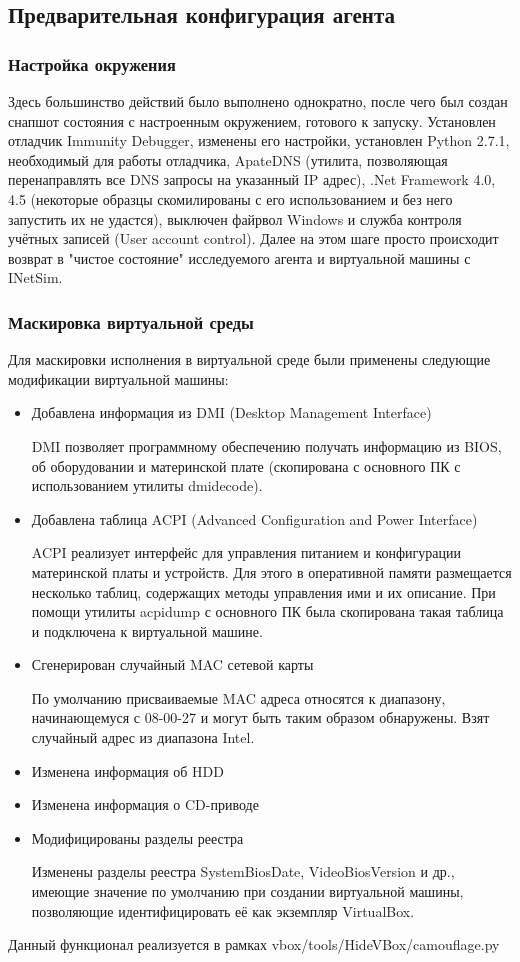 \subsection {Предварительная конфигурация агента}
\subsubsection {Настройка окружения}
Здесь большинство действий было выполнено однократно, после чего был создан снапшот состояния с настроенным окружением, готового к запуску. Установлен отладчик Immunity Debugger, изменены его настройки, установлен Python 2.7.1, необходимый для работы отладчика, ApateDNS (утилита, позволяющая перенаправлять все DNS запросы на указанный IP адрес), .Net Framework 4.0, 4.5 (некоторые образцы скомилированы с его использованием и без него запустить их не удастся), выключен файрвол Windows и служба контроля учётных записей (User account control).
Далее на этом шаге просто происходит возврат в "чистое состояние" исследуемого агента и виртуальной машины с INetSim.
\subsubsection {Маскировка виртуальной среды}
Для маскировки исполнения в виртуальной среде были применены следующие модификации виртуальной машины:
\begin {itemize}
	\item Добавлена информация из DMI (Desktop Management Interface)

	DMI позволяет программному обеспечению получать информацию из BIOS, об оборудовании и материнской плате (скопирована с основного ПК с использованием утилиты dmidecode).
	\item Добавлена таблица ACPI (Advanced Configuration and Power Interface)

	ACPI реализует интерфейс для управления питанием и конфигурации материнской платы и устройств. Для этого в оперативной памяти размещается несколько таблиц, содержащих методы управления ими и их описание. При помощи утилиты acpidump с основного ПК была скопирована такая таблица и подключена к виртуальной машине.
	\item Сгенерирован случайный MAC сетевой карты

	По умолчанию присваиваемые MAC адреса относятся к диапазону, начинающемуся с 08-00-27 и могут быть таким образом обнаружены. Взят случайный адрес из диапазона Intel.
	\item Изменена информация об HDD
	\item Изменена информация о CD-приводе
	\item Модифицированы разделы реестра

	Изменены разделы реестра SystemBiosDate, VideoBiosVersion и др., имеющие значение по умолчанию при создании виртуальной машины, позволяющие идентифицировать её как экземпляр VirtualBox.
\end {itemize}
Данный функционал реализуется в рамках vbox/tools/HideVBox/camouflage.py

